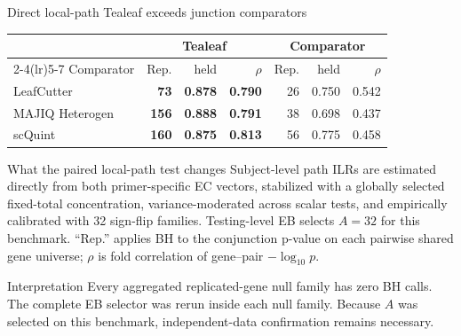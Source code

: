 \documentclass[aspectratio=169,10pt]{beamer}
\begin{document}
\begin{frame}{Direct local-path Tealeaf exceeds junction comparators}
\centering
\scriptsize
\renewcommand{\arraystretch}{1.23}
\setlength{\tabcolsep}{5.5pt}
\begin{tabular}{lrrrrrr}
\toprule
& \multicolumn{3}{c}{Tealeaf} & \multicolumn{3}{c}{Comparator}\\
\cmidrule(lr){2-4}\cmidrule(lr){5-7}
Comparator & Rep. & held & $\rho$ & Rep. & held & $\rho$\\
\midrule
LeafCutter & \textbf{73} & \textbf{0.878} & \textbf{0.790} & 26 & 0.750 & 0.542\\
MAJIQ Heterogen & \textbf{156} & \textbf{0.888} & \textbf{0.791} & 38 & 0.698 & 0.437\\
scQuint & \textbf{160} & \textbf{0.875} & \textbf{0.813} & 56 & 0.775 & 0.458\\
\bottomrule
\end{tabular}
\vspace{0.4cm}
\begin{block}{What the paired local-path test changes}
\scriptsize Subject-level path ILRs are estimated directly from both primer-specific EC vectors, stabilized with a globally selected fixed-total concentration, variance-moderated across scalar tests, and empirically calibrated with 32 sign-flip families. Testing-level EB selects $A=32$ for this benchmark. ``Rep.'' applies BH to the conjunction p-value on each pairwise shared gene universe; $\rho$ is fold correlation of gene--pair $-\log_{10}p$.
\end{block}
\begin{alertblock}{Interpretation}
\scriptsize Every aggregated replicated-gene null family has zero BH calls. The complete EB selector was rerun inside each null family. Because $A$ was selected on this benchmark, independent-data confirmation remains necessary.
\end{alertblock}
\end{frame}
\end{document}

